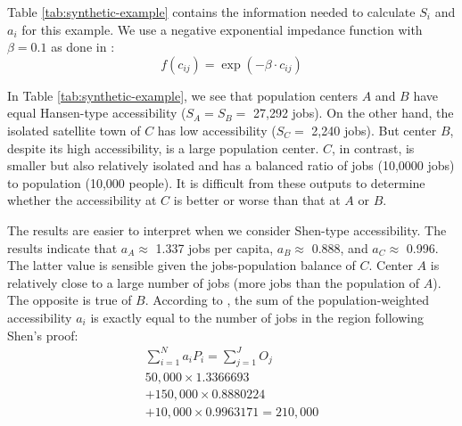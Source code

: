\documentclass[]{elsarticle} %
\begin{document}
\begin{table}[ht]
\end{table}
 

Table \ref{tab:synthetic-example} contains the information needed to
calculate \(S_i\) and \(a_i\) for this example. We use a negative
exponential impedance function with \(\beta=0.1\) as done in \citet[see
footnote (5)]{shen1998}: \[
f(c_{ij}) = \exp(-\beta\cdot c_{ij})
\]

In Table \ref{tab:synthetic-example}, we see that population centers
\(A\) and \(B\) have equal Hansen-type accessibility (\(S_A = S_B=\)
27,292 jobs). On the other hand, the isolated satellite town of \(C\)
has low accessibility (\(S_C=\) 2,240 jobs). But center \(B\), despite
its high accessibility, is a large population center. \(C\), in
contrast, is smaller but also relatively isolated and has a balanced
ratio of jobs (10,0000 jobs) to population (10,000 people). It is
difficult from these outputs to determine whether the accessibility at
\(C\) is better or worse than that at \(A\) or \(B\).

The results are easier to interpret when we consider Shen-type
accessibility. The results indicate that \(a_A \approx\) 1.337 jobs per
capita, \(a_B \approx\) 0.888, and \(a_C\approx\) 0.996. The latter
value is sensible given the jobs-population balance of \(C\). Center
\(A\) is relatively close to a large number of jobs (more jobs than the
population of \(A\)). The opposite is true of \(B\). According to
\citet{shen1998}, the sum of the population-weighted accessibility
\(a_i\) is exactly equal to the number of jobs in the region following
Shen's proof: \[
\begin{array}{l}
\sum_{i=1}^N a_{i} P_i= \sum_{j=1}^JO_j\\
50,000\times 1.3366693 \\
+ 150,000 \times 0.8880224 \\
+ 10,000 \times 0.9963171 = 210,000
\end{array}
\]
\end{document}
